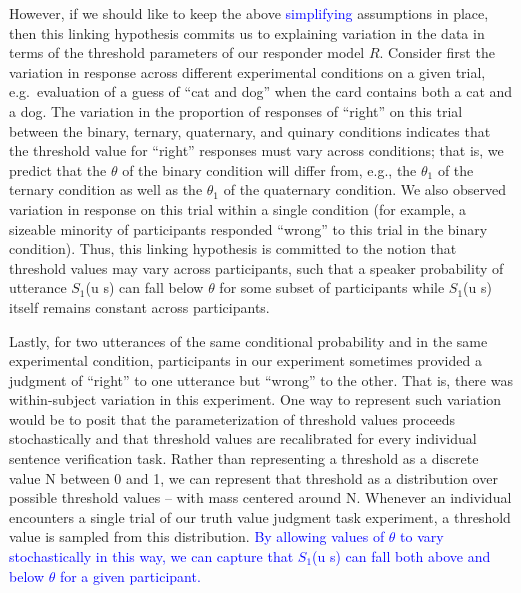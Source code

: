 \documentclass[man]{apa6}
\newcommand{\change}[1]{\textcolor{Blue}{#1}}
\theoremstyle{definition}
\theoremstyle{definition}
\theoremstyle{definition}
\theoremstyle{remark}
\begin{document}
However, if we should like to keep the above \change{simplifying} assumptions in place, then
this linking hypothesis commits us to explaining variation in the data in terms
of the threshold parameters of our responder model \(R\). Consider first
the variation in response across different experimental conditions on a
given trial, e.g.~evaluation of a guess of \enquote{cat and dog} when
the card contains both a cat and a dog. The variation in the proportion
of responses of \enquote{right} on this trial between the binary,
ternary, quaternary, and quinary conditions indicates that the threshold
value for \enquote{right} responses must vary across conditions; that
is, we predict that the \(\theta\) of the binary condition will differ
from, e.g., the \(\theta_1\) of the ternary condition as well as the
\(\theta_1\) of the quaternary condition. We also observed variation in
response on this trial within a single condition (for example, a
sizeable minority of participants responded \enquote{wrong} to this
trial in the binary condition). Thus, this linking hypothesis is
committed to the notion that threshold values may vary across
participants, such that a speaker probability of utterance \(S_1\)(u
\textbar{} s) can fall below \(\theta\) for some subset of participants
while \(S_1\)(u \textbar{} s) itself remains constant across
participants.

Lastly, for two utterances of the same
conditional probability and in the same experimental condition, 
participants in our experiment sometimes provided a judgment of
\enquote{right} to one utterance but \enquote{wrong} to the other. That
is, there was within-subject variation in this
experiment. One way to represent such variation would be to posit that
the parameterization of threshold values proceeds stochastically and
that threshold values are recalibrated for every individual sentence
verification task. Rather than representing a threshold as a discrete
value N between 0 and 1, we can represent that threshold as a
distribution over possible threshold values -- with mass centered around
N. Whenever an individual encounters  a single trial of our truth value judgment task experiment, a
threshold value is sampled from this distribution. \change{By  allowing values of \(\theta\) to vary stochastically in this way, we can capture that \(S_1\)(u \textbar{} s) can fall both above and below \(\theta\) for a given
participant.}
\end{document}
